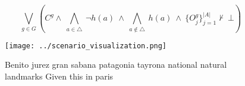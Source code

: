 \documentclass[a4paper]{article}
\begin{document}
\[\bigvee_{g\in G} (C^g \wedge\ \bigwedge_{a\in \triangle}\ \neg h(a)\ \wedge\ \bigwedge_{a\notin \triangle}\ h(a)\ \wedge\ \{O_j^g\}_{j=1}^{|A|} \nvdash\ \bot )\]

\begin{figure}
\centering
\texttt{[image: ../scenario\_visualization.png]}
\caption{Benito jurez gran sabana patagonia tayrona national natural landmarks Given this in paris
}
\end{figure}
 
\end{document}
